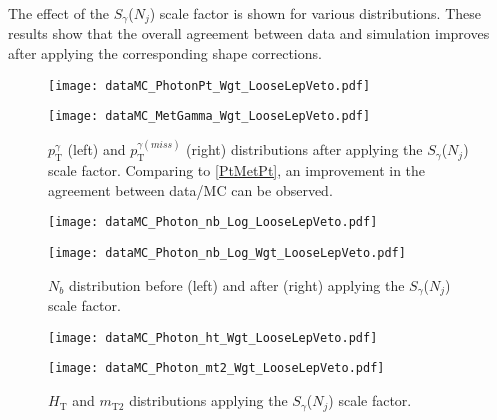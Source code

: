 The effect of the $S_{\gamma}$($N_j$) scale factor is shown for various distributions. These results show that the overall agreement between data and simulation improves after applying the corresponding shape corrections.

\begin{figure}[H]
\begin{center}
\begin{minipage}[b]{0.45\textwidth}
    \texttt{[image: dataMC\_PhotonPt\_Wgt\_LooseLepVeto.pdf]}
\end{minipage}
\begin{minipage}[b]{0.45\textwidth}
    \texttt{[image: dataMC\_MetGamma\_Wgt\_LooseLepVeto.pdf]}
\end{minipage}
\end{center}
\vspace{-1em}
\caption{$p_\text{T}^\gamma$ (left) and $p_\text{T}^{\gamma (miss)}$ (right) distributions after applying the $S_\gamma$($N_j$) scale factor. Comparing to \autoref{PtMetPt}, an improvement in the agreement between data/MC can be observed.}
\label{PtMetPtCorr}
\end{figure}

\vspace {1em}

\begin{figure}[H]
\begin{center}
\begin{minipage}[b]{0.45\textwidth}
    \texttt{[image: dataMC\_Photon\_nb\_Log\_LooseLepVeto.pdf]}
\end{minipage}
\begin{minipage}[b]{0.45\textwidth}
    \texttt{[image: dataMC\_Photon\_nb\_Log\_Wgt\_LooseLepVeto.pdf]}
\end{minipage}
\end{center}
\vspace{-1em}
\caption{$N_b$ distribution before (left) and after (right) applying the $S_\gamma$($N_j$) scale factor. }
\end{figure}


\begin{figure}[tb]
\begin{center}
\begin{minipage}[b]{0.45\textwidth}
    \texttt{[image: dataMC\_Photon\_ht\_Wgt\_LooseLepVeto.pdf]}
\end{minipage}
\begin{minipage}[b]{0.45\textwidth}
    \texttt{[image: dataMC\_Photon\_mt2\_Wgt\_LooseLepVeto.pdf]}
\end{minipage}
\end{center}
\vspace{-1em}
\caption{$H_\text{T}$ and $m_\text{T2}$ distributions applying the $S_\gamma$($N_j$) scale factor. }
\end{figure}

